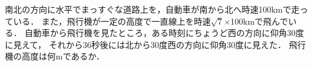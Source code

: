\documentclass[../../main.tex]{subfiles}
\begin{document}
南北の方向に水平でまっすぐな道路上を，自動車が南から北へ時速100kmで走っている．
また，飛行機が一定の高度で一直線上を時速$\sqrt7$×100kmで飛んでいる．
自動車から飛行機を見たところ，ある時刻にちょうど西の方向に仰角30度に見えて，
それから36秒後には北から30度西の方向に仰角30度に見えた．
飛行機の高度は何mであるか．
\end{document}
